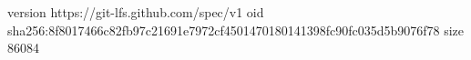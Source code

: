 version https://git-lfs.github.com/spec/v1
oid sha256:8f8017466c82fb97c21691e7972cf4501470180141398fc90fc035d5b9076f78
size 86084
